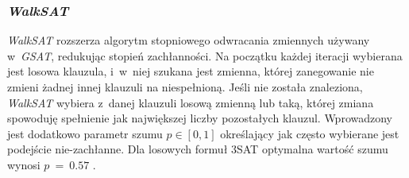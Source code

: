 \subsubsection{\textit{WalkSAT}}
\textit{WalkSAT} rozszerza algorytm stopniowego odwracania zmiennych używany w~\textit{GSAT}, redukując stopień zachłanności.
Na początku każdej iteracji wybierana jest losowa klauzula, i~w~niej szukana jest zmienna, której zanegowanie nie zmieni żadnej
innej klauzuli na niespełnioną. Jeśli nie została znaleziona, \textit{WalkSAT} wybiera z~danej klauzuli losową zmienną lub taką, której
zmiana spowoduję spełnienie jak największej liczby pozostałych klauzul. Wprowadzony jest dodatkowo parametr szumu $p \in [0, 1]$ określający
jak często wybierane jest podejście nie-zachłanne. Dla losowych formuł 3SAT optymalna wartość szumu wynosi $p~=~0.57$ \cite{handbook-satifiability-incomplete}.

